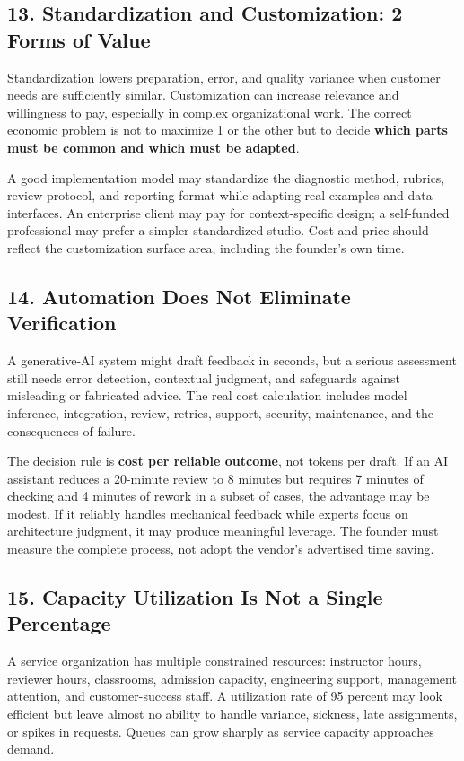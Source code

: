 \subsection*{13. Standardization and Customization: 2 Forms of Value}

Standardization lowers preparation, error, and quality variance when customer needs are sufficiently similar. Customization can increase relevance and willingness to pay, especially in complex organizational work. The correct economic problem is not to maximize 1 or the other but to decide \textbf{which parts must be common and which must be adapted}.

A good implementation model may standardize the diagnostic method, rubrics, review protocol, and reporting format while adapting real examples and data interfaces. An enterprise client may pay for context-specific design; a self-funded professional may prefer a simpler standardized studio. Cost and price should reflect the customization surface area, including the founder's own time.

\subsection*{14. Automation Does Not Eliminate Verification}

A generative-AI system might draft feedback in seconds, but a serious assessment still needs error detection, contextual judgment, and safeguards against misleading or fabricated advice. The real cost calculation includes model inference, integration, review, retries, support, security, maintenance, and the consequences of failure.

The decision rule is \textbf{cost per reliable outcome}, not tokens per draft. If an AI assistant reduces a 20-minute review to 8 minutes but requires 7 minutes of checking and 4 minutes of rework in a subset of cases, the advantage may be modest. If it reliably handles mechanical feedback while experts focus on architecture judgment, it may produce meaningful leverage. The founder must measure the complete process, not adopt the vendor's advertised time saving.

\subsection*{15. Capacity Utilization Is Not a Single Percentage}

A service organization has multiple constrained resources: instructor hours, reviewer hours, classrooms, admission capacity, engineering support, management attention, and customer-success staff. A utilization rate of 95 percent may look efficient but leave almost no ability to handle variance, sickness, late assignments, or spikes in requests. Queues can grow sharply as service capacity approaches demand.

